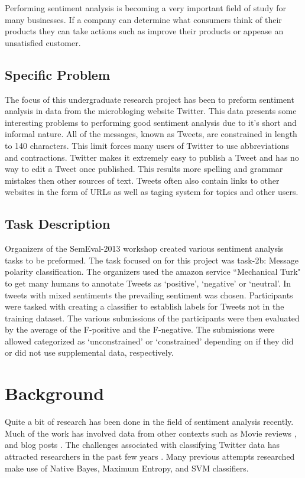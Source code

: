 \documentclass[12pt]{article}
\begin{document}
Performing sentiment analysis is becoming a very important field of study for
many businesses. If a company can determine what consumers think of their
products they can take actions such as improve their products or appease an
unsatisfied customer.

\subsection{Specific Problem}

The focus of this undergraduate research project has been to preform sentiment
analysis in data from the microbloging website Twitter. This data presents some
interesting problems to performing good sentiment analysis due to it's short
and informal nature. All of the messages, known as Tweets, are constrained in
length to 140 characters. This limit forces many users of Twitter to use
abbreviations and contractions. Twitter makes it extremely easy to publish a
Tweet and has no way to edit a Tweet once published. This results more spelling
and grammar mistakes then other sources of text. Tweets often also contain
links to other websites in the form of URLs as well as taging system for topics
and other users.

\subsection{Task Description}

Organizers of the SemEval-2013 workshop created various sentiment analysis
tasks to be preformed. The task focused on for this project was task-2b:
Message polarity classification. The organizers used the amazon service
``Mechanical Turk" to get many humans to annotate Tweets as `positive',
`negative' or `neutral'. In tweets with mixed sentiments the prevailing
sentiment was chosen. Participants were tasked with creating a classifier to
establish labels for Tweets not in the training dataset. The various
submissions of the participants were then evaluated by the average of the
F-positive and the F-negative. The submissions were allowed categorized as
`unconstrained' or `constrained' depending on if they did or did not use
supplemental data, respectively.

\section{Background}

Quite a bit of research has been done in the field of sentiment analysis
recently. Much of the work has involved data from other contexts such as Movie
reviews \cite{Pang2002}, and blog posts \cite{Melville2009}. The challenges
associated with classifying Twitter data has attracted researchers in the past
few years \cite{Jianfeng2013} \cite{Barbosa2010} \cite{Gokulakrishnan2012}.
Many previous attempts researched make use of Native Bayes, Maximum Entropy,
and SVM classifiers.
\end{document}
